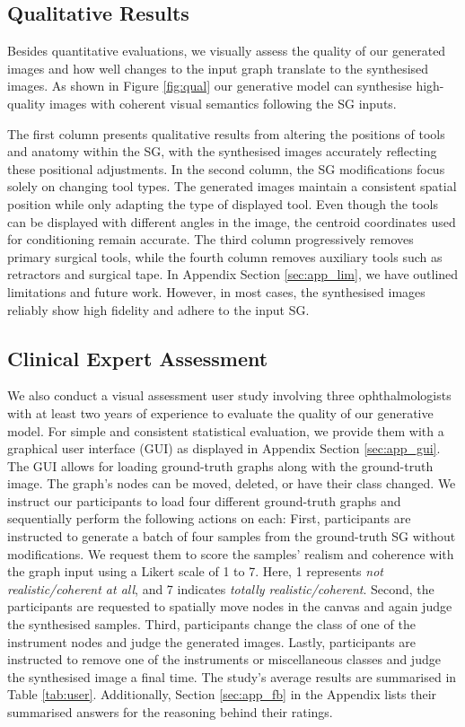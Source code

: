 \subsection{Qualitative Results}
Besides quantitative evaluations, we visually assess the quality of our generated images and how well changes to the input graph translate to the synthesised images. As shown in Figure \ref{fig:qual} our generative model can synthesise high-quality images with coherent visual semantics following the SG inputs. 

The first column presents qualitative results from altering the positions of tools and anatomy within the SG, with the synthesised images accurately reflecting these positional adjustments. In the second column, the SG modifications focus solely on changing tool types. The generated images maintain a consistent spatial position while only adapting the type of displayed tool. Even though the tools can be displayed with different angles in the image, the centroid coordinates used for conditioning remain accurate. The third column progressively removes primary surgical tools, while the fourth column removes auxiliary tools such as retractors and surgical tape. In Appendix Section \ref{sec:app_lim}, we have outlined limitations and future work. However, in most cases, the synthesised images reliably show high fidelity and adhere to the input SG.

\subsection{Clinical Expert Assessment}
\label{sec:study}
We also conduct a visual assessment user study involving three ophthalmologists with at least two years of experience to evaluate the quality of our generative model. For simple and consistent statistical evaluation, we provide them with a graphical user interface (GUI) as displayed in Appendix Section \ref{sec:app_gui}. The GUI allows for loading ground-truth graphs along with the ground-truth image. The graph’s nodes can be moved, deleted, or have their class changed. We instruct our participants to load four different ground-truth graphs and sequentially perform the following actions on each: First, participants are instructed to generate a batch of four samples from the ground-truth SG without modifications. We request them to score the samples’ realism and coherence with the graph input using a Likert scale of 1 to 7. Here, 1 represents \emph{not realistic/coherent at all}, and 7 indicates \emph{totally realistic/coherent}. Second, the participants are requested to spatially move nodes in the canvas and again judge the synthesised samples. Third, participants change the class of one of the instrument nodes and judge the generated images. Lastly, participants are instructed to remove one of the instruments or miscellaneous classes and judge the synthesised image a final time. The study’s average results are summarised in Table \ref{tab:user}. Additionally, Section \ref{sec:app_fb} in the Appendix lists their summarised answers for the reasoning behind their ratings.

